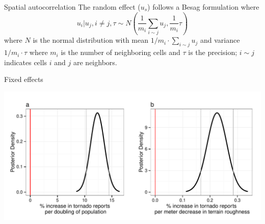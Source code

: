 \documentclass[handout]{beamer}
\begin{document}
\begin{frame}{Spatial autocorrelation}
The random effect ($u_s$) follows a Besag formulation where
$$
u_i | u_j, i \neq j, \tau \sim N\left(\frac{1}{m_i} \sum_{i \sim j} u_j , \frac{1}{m_i} \tau\right)
$$
where $N$ is the normal distribution with mean $1/m_i \cdot \sum_{i \sim j} u_j$ and variance $1/m_i \cdot \tau$ where $m_i$ is the number of neighboring cells and $\tau$ is the precision; $i \sim j$ indicates cells $i$ and $j$ are neighbors.
\end{frame}

\begin{frame}{Fixed effects}
\vspace{-1cm}
\begin{center}
\includegraphics[scale=.54]{figures/FixedEffects.pdf}
\end{center}
\end{frame}
\end{document}
